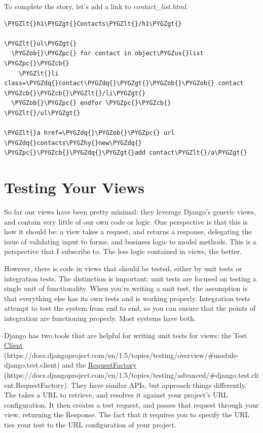 \documentclass[letterpaper,10pt,english]{sphinxmanual}
\def\PYGZus{\char`\_}
\def\PYGZob{\char`\{}
\def\PYGZcb{\char`\}}
\def\PYGZlt{\char`\<}
\def\PYGZgt{\char`\>}
\def\PYGZpc{\char`\%}
\def\PYGZhy{\char`\-}
\def\PYGZdq{\char`\"}
\begin{document}
To complete the story, let's add a link to \emph{contact\_list.html}.

\begin{Verbatim}[commandchars=\\\{\}]
\PYGZlt{}h1\PYGZgt{}Contacts\PYGZlt{}/h1\PYGZgt{}

\PYGZlt{}ul\PYGZgt{}
  \PYGZob{}\PYGZpc{} for contact in object\PYGZus{}list \PYGZpc{}\PYGZcb{}
    \PYGZlt{}li class=\PYGZdq{}contact\PYGZdq{}\PYGZgt{}\PYGZob{}\PYGZob{} contact \PYGZcb{}\PYGZcb{}\PYGZlt{}/li\PYGZgt{}
  \PYGZob{}\PYGZpc{} endfor \PYGZpc{}\PYGZcb{}
\PYGZlt{}/ul\PYGZgt{}

\PYGZlt{}a href=\PYGZdq{}\PYGZob{}\PYGZpc{} url \PYGZdq{}contacts\PYGZhy{}new\PYGZdq{} \PYGZpc{}\PYGZcb{}\PYGZdq{}\PYGZgt{}add contact\PYGZlt{}/a\PYGZgt{}
\end{Verbatim}


\section{Testing Your Views}
\label{tutorial/views:testing-your-views}
So far our views have been pretty minimal: they leverage Django's
generic views, and contain very little of our own code or logic. One
perspective is that this is how it should be: a view takes a request,
and returns a response, delegating the issue of validating input to
forms, and business logic to model methods. This is a perspective that
I subscribe to. The less logic contained in views, the better.

However, there is code in views that should be tested, either by unit
tests or integration tests. The distinction is important: unit tests
are focused on testing a single unit of functionality. When you're
writing a unit test, the assumption is that everything else has its
own tests and is working properly. Integration tests attempt to test
the system from end to end, so you can ensure that the points of
integration are functioning properly. Most systems have both.

Django has two tools that are helpful for writing unit tests for
views: the Test \href{https://docs.djangoproject.com/en/1.5/topics/testing/overview/\#module-django.test.client}{Client} (https://docs.djangoproject.com/en/1.5/topics/testing/overview/\#module-django.test.client) and the \href{https://docs.djangoproject.com/en/1.5/topics/testing/advanced/\#django.test.client.RequestFactory}{RequestFactory} (https://docs.djangoproject.com/en/1.5/topics/testing/advanced/\#django.test.client.RequestFactory). They have similar
APIs, but approach things differently. The  takes a URL
to retrieve, and resolves it against your project's URL configuration.
It then creates a test request, and passes that request through your
view, returning the Response. The fact that it requires you to specify
the URL ties your test to the URL configuration of your project.
\end{document}
